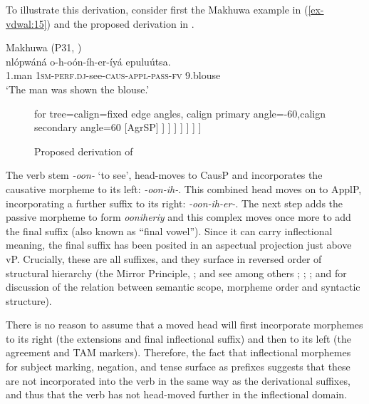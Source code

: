 \documentclass[output=paper
,modfonts
,nonflat]{langsci/langscibook}
\begin{document}
To illustrate this derivation, consider first the Makhuwa example in (\ref{ex-vdwal:15}) and the proposed derivation in . 


\begin{exe}
\ex Makhuwa (P31, \citealt[169]{Van_der_Wal2009})\label{ex-vdwal:15}\\ 
	\gll nlópwáná o-h-oón-íh-er-íyá epuluútsa.\\
	1.man 1\textsc{sm}-\textsc{perf}.\textsc{dj}-see-\textsc{caus}-\textsc{appl}-\textsc{pass}-\textsc{fv} 9.blouse\\
	\glt `The man was shown the blouse.'
\end{exe}

\begin{figure}
\caption{Proposed derivation of \label{fig-vdwal:18}}
		\begin{forest} for tree={calign=fixed edge angles, calign primary angle=-60,calign secondary angle=60}
			[AgrSP\footnotemark
			[o-] 
			[TP 
			[-h-] 
			[AspP
			[{[} {[} {[} {[} {[} -oon{]} \textsubscript{i}ih{]}\textsubscript{j}er{]}\textsubscript{k}iy{]}\textsubscript{m}a{]}]
			[vP
			[t]
			[PassP
			[t\textsubscript{m}]
			[ApplP
			[t\textsubscript{k}]
			[CausP
			[t\textsubscript{j}]
			[VP
			[t\textsubscript{i}]
			[epuluutsa
			] ] ] ]	] ] ] ] ]			
	\end{forest}
\end{figure}

The verb stem \textit{-oon-} ‘to see’, head-moves to CausP and incorporates the caus\-a\-tive morpheme to its left: \textit{-oon-ih-}. This combined head moves on to ApplP, incorporating a further suffix to its right: \textit{-oon-ih-er-}. The next step adds the passive morpheme to form \textit{ooniheriy} and this complex moves once more to add the final suffix (also known as ``final vowel''). Since it can carry inflectional meaning, the final suffix has been posited in an aspectual projection just above vP. Crucially, these are all suffixes, and they surface in reversed order of structural hierarchy (the Mirror Principle, \citealt{Baker1985, Baker1988}; and see among others \citealt{Alsina1999}; \citealt{Hyman2003}; \citealt{Good2005}; and \citealt{Muriungi2008} for discussion of the relation between semantic scope, morpheme order and syntactic structure).

There is no reason to assume that a moved head will first incorporate morphemes to its right (the extensions and final inflectional suffix) and then to its left (the agreement and TAM markers). Therefore, the fact that inflectional morphemes for subject marking, negation, and tense surface as prefixes suggests that these are not incorporated into the verb in the same way as the derivational suffixes, and thus that the verb has not head-moved further in the inflectional domain.\largerpage
\end{document}
